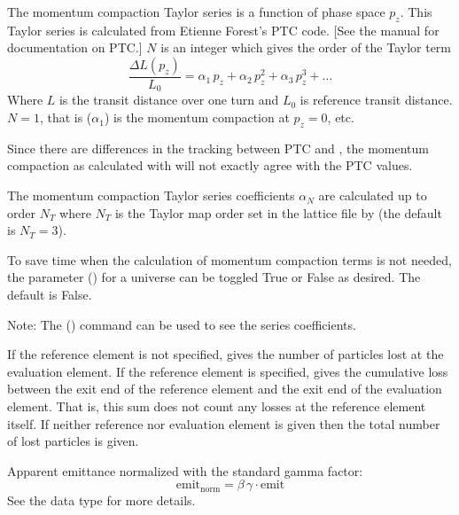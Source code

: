 \begin{description}
{{{{{{The momentum compaction Taylor series is a function of phase space $p_z$. This Taylor series
is calculated from Etienne Forest's PTC code. [See the \bmad manual for documentation on PTC.] $N$ is
an integer which gives the order of the Taylor term
\begin{equation}
  \frac{\Delta L(p_z)}{L_0} = \alpha_1 \, p_z + \alpha_2 \, p_z^2 + \alpha_3 \, p_z^3 + \ldots
\end{equation}
Where $L$ is the transit distance over one turn and $L_0$ is reference transit distance.  $N = 1$,
that is  ($\alpha_1$) is the momentum compaction at $p_z = 0$, etc.

Since there are differences in the tracking between PTC and \bmad, the momentum compaction as calculated
with \bmad will not exactly agree with the PTC values.

The momentum compaction Taylor series coefficients $\alpha_N$ are calculated up to order $N_T$ where
$N_T$ is the Taylor map order set in the lattice file by  (the default
is $N_T=3$).

To save time when the calculation of momentum compaction terms is not needed, the  parameter
() for a universe can be toggled True or False as desired. The default is False.

Note: The  () command can be used to see the series coefficients.

  \item[n_particle_loss] \Newline {}
If the reference element is not specified,  gives the number of particles lost
at the evaluation element. If the reference element is specified,  gives the
cumulative loss between the exit end of the reference element and the exit end of the evaluation
element. That is, this sum does not count any losses at the reference element itself. If neither
reference nor evaluation element is given then the total number of lost particles is given.

  \item[norm_apparent_emit.x, .y] \Newline {}
Apparent emittance normalized with the standard gamma factor:
\begin{equation}
  \text{emit}_{\text{norm}} = \beta \, \gamma \cdot \text{emit}
\end{equation}
See the  data type for more details.

}}}}}}
\end{description}
